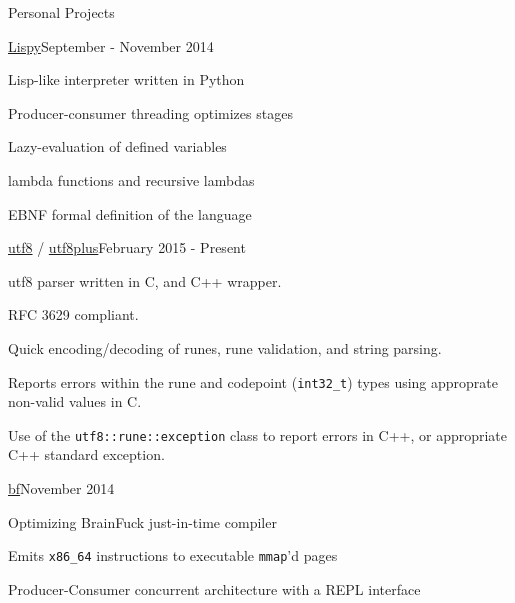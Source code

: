 \documentclass{resume} %
\begin{document}
\clearpage

\begin{rSection}{Personal Projects}

\begin{rSubsection}{\href{http://github.com/cptaffe/lispy}{Lispy}}{September - November 2014}{}{}

	\item Lisp-like interpreter written in Python
	\item Producer-consumer threading optimizes stages
	\item Lazy-evaluation of defined variables
	\item lambda functions and recursive lambdas
	\item EBNF formal definition of the language
\end{rSubsection}

\begin{rSubsection}{\href{http://github.com/cptaffe/utf8}{utf8} / \href{http://github.com/cptaffe/utf8plus}{utf8plus}}{February 2015 - Present}{}{}

	\item utf8 parser written in C, and C++ wrapper.
	\item RFC 3629 compliant.
	\item Quick encoding/decoding of runes, rune validation, and string parsing.
	\item Reports errors within the rune and codepoint ({\tt int32\_t}) types using approprate non-valid values in C.
	\item Use of the \verb!utf8::rune::exception! class to report errors in C++, or appropriate C++ standard exception.
\end{rSubsection}

\begin{rSubsection}{\href{http://github.com/cptaffe/bf}{bf}}{November 2014}{}{}

	\item Optimizing BrainFuck just-in-time compiler
	\item Emits {\tt x86\_64} instructions to executable {\tt mmap}'d pages
	\item Producer-Consumer concurrent architecture with a REPL interface
\end{rSubsection}

\end{rSection}

\end{document}
